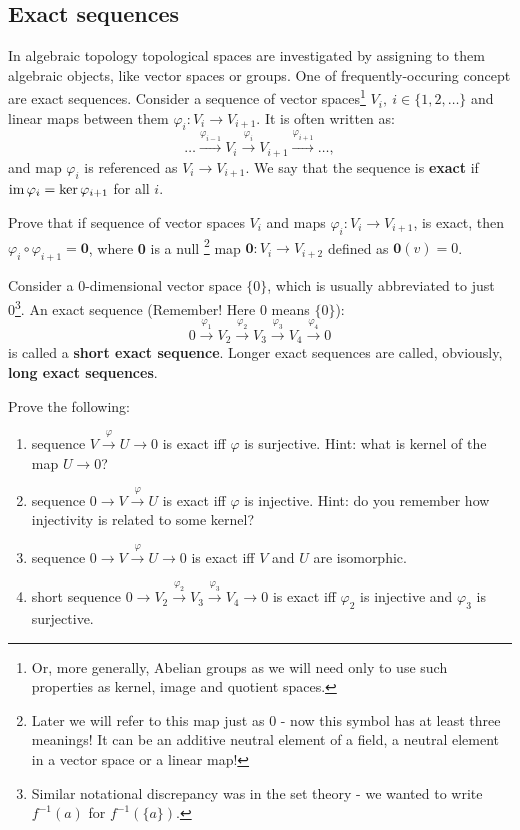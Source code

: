 \subsection{Exact sequences}
In algebraic topology topological spaces are investigated by assigning to them algebraic objects, like vector spaces or groups. One of frequently-occuring concept are exact sequences.
Consider a sequence of vector spaces\footnote{Or, more generally, Abelian groups as we will need only to use such properties as kernel, image and quotient spaces.} $V_i,~i\in \{1,2,\dots\}$ and linear maps between them $\varphi_i : V_i\to V_{i+1}$. It is often written as:
$$\dots\stackrel{\varphi_{i-1}}{\longrightarrow} V_i\stackrel{\varphi_i}\longrightarrow V_{i+1} \stackrel{\varphi_{i+1}}\longrightarrow \dots,$$
and map $\varphi_i$ is referenced as $V_i\to V_{i+1}$. We say that the sequence is \textbf{exact} if $\text{im\,} \varphi_{i}=\text{ker\,} \varphi_{i+1}$ for all $i$.

\begin{prob}
  Prove that if sequence of vector spaces $V_i$ and maps $\varphi_i : V_i\to V_{i+1}$, is exact, then $\varphi_i\circ \varphi_{i+1}=\textbf{0}$, where \textbf{0} is a null \footnote{Later we will refer to this map just as 0 - now this symbol has at least three meanings! It can be an additive neutral element of a field, a neutral element in a vector space or a linear map!} map $\textbf{0}: V_i\to V_{i+2}$ defined as $\textbf{0}(v)=0$.
\end{prob}

Consider a $0$-dimensional vector space $\{0\}$, which is usually abbreviated to just 0\footnote{Similar notational discrepancy was in the set theory - we wanted to write
$f^{-1}(a)$ for $f^{-1}(\{a\})$.

}. An exact sequence (Remember! Here 0 means $\{0\}$):
$$0\stackrel{\varphi_1}{\longrightarrow} V_2\stackrel{\varphi_2}{\longrightarrow} V_3\stackrel{\varphi_3}{\longrightarrow} V_4\stackrel{\varphi_4}{\longrightarrow} 0$$
is called a \textbf{short exact sequence}. Longer exact sequences are called, obviously, \textbf{long exact sequences}.

\begin{prob}
  Prove the following:
  \begin{enumerate}
    \item sequence $V\stackrel{\varphi}{\longrightarrow}U\longrightarrow 0$ is exact iff $\varphi$ is surjective. Hint: what is kernel of the map $U\to 0$?
    \item sequence $0\longrightarrow V\stackrel{\varphi}{\longrightarrow}U$ is exact iff $\varphi$ is injective. Hint: do you remember how injectivity is related to some kernel?
    \item sequence $0\longrightarrow V\stackrel{\varphi}{\longrightarrow}U\longrightarrow 0$ is exact iff $V$ and $U$ are isomorphic.
    \item short sequence
      $0\longrightarrow V_2\stackrel{\varphi_2}{\longrightarrow} V_3\stackrel{\varphi_3}{\longrightarrow} V_4\longrightarrow 0$
      is exact iff $\varphi_2$ is injective and $\varphi_3$ is surjective.
  \end{enumerate}
\end{prob}

